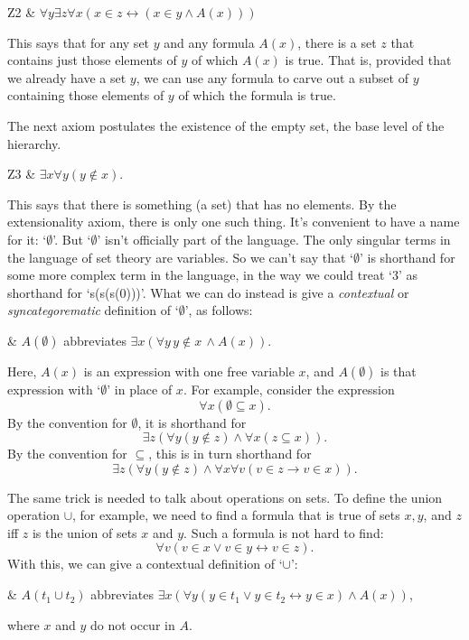 \begin{axioms}
  Z2 & $\forall y \exists z \forall x( x\in z \leftrightarrow ( x\in y \land A(x)))$
\end{axioms}
\noindent%
This says that for any set $y$ and any formula $A(x)$,
there is a set $z$ that contains just those elements of $y$ of which $A(x)$ is true.
That is,
provided that we already have a set $y$,
we can use any formula to carve out a subset of $y$
containing those elements of $y$ of which the formula is true.

The next axiom postulates the existence of the empty set,
the base level of the hierarchy.

\begin{axioms}
   Z3 & $\exists x\forall y(y\notin x).$
\end{axioms}
\noindent%
This says that there is something (a set) that has no elements.
By the extensionality axiom,
there is only one such thing.
It's convenient to have a name for it: `$\emptyset$'.
But `$\emptyset$' isn't officially part of the language.
The only singular terms in the language of set theory are variables.
So we can't say that `$\emptyset$' is shorthand for some more complex term in the language,
in the way we could treat `3' as shorthand for `s(s(s(0)))'.
What we can do instead is give a \emph{contextual} or \emph{syncategorematic} definition of `$\emptyset$',
as follows:

\begin{axioms}
  & $A(\emptyset)$ abbreviates $\exists x(\forall y\, y\notin x\, \land A(x))$.
\end{axioms}
%
Here, $A(x)$ is an expression with one free variable $x$,
and $A(\emptyset)$ is that expression with `$\emptyset$' in place of $x$.
For example, consider the expression
\[
  \forall x(\emptyset \subseteq x).
\]
By the convention for $\emptyset$,
it is shorthand for
\[
  \exists z(\forall y(y\notin z) \land \forall x(z \subseteq x)).
\]
By the convention for $\subseteq$, this is in turn shorthand for
\[
  \exists z(\forall y(y\notin z) \land \forall x\forall v(v \in z \to v \in x)).
\]

The same trick is needed to talk about operations on sets.
To define the union operation $\cup$,
for example,
we need to find a formula that is true of sets $x,y$, and $z$
iff $z$ is the union of sets $x$ and $y$.
Such a formula is not hard to find:
\[
  \forall v(v\in x \lor v \in y \leftrightarrow v \in z).
\]
With this, we can give a contextual definition of `$\cup$':

\begin{axioms}
  &
  $A(t_{1} \cup t_{2})$ abbreviates
  $\exists x(\forall y(y\in t_1 \lor y \in t_2 \leftrightarrow y \in x) \land A(x))$,
\end{axioms}
%
\noindent%
where $x$ and $y$ do not occur in $A$.

